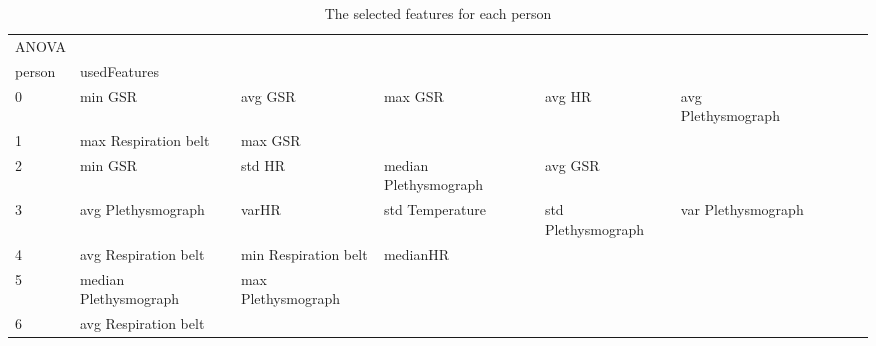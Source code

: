 \begin{landscape}
\begin{table}[]
\centering
\caption{The selected features for each person}
\begin{tabular}{l|llllllll}
ANOVA    &                         &                         &                         &                         &                         &                       &                         &                         &                         &         \\
person   & usedFeatures            &                         &                         &                         &                         &                       &                         &                         &                         &         \\
0        & min GSR                 & avg GSR                 & max GSR                 & avg HR                  & avg Plethysmograph      &                       &                         &                         &                         &         \\
1        & max Respiration belt    & max GSR                 &                         &                         &                         &                       &                         &                         &                         &         \\
2        & min GSR                 & std HR                  & median Plethysmograph   & avg GSR                 &                         &                       &                         &                         &                         &         \\
3        & avg Plethysmograph      & varHR                   & std Temperature         & std Plethysmograph      & var Plethysmograph      &                       &                         &                         &                         &         \\
4        & avg Respiration belt    & min Respiration belt    & medianHR                &                         &                         &                       &                         &                         &                         &         \\
5        & median Plethysmograph   & max Plethysmograph      &                         &                         &                         &                       &                         &                         &                         &         \\
6        & avg Respiration belt    &                         &                         &                         &                         &                       &                         &                         &                         &         \\

\end{tabular}
\end{table}
\end{landscape}
